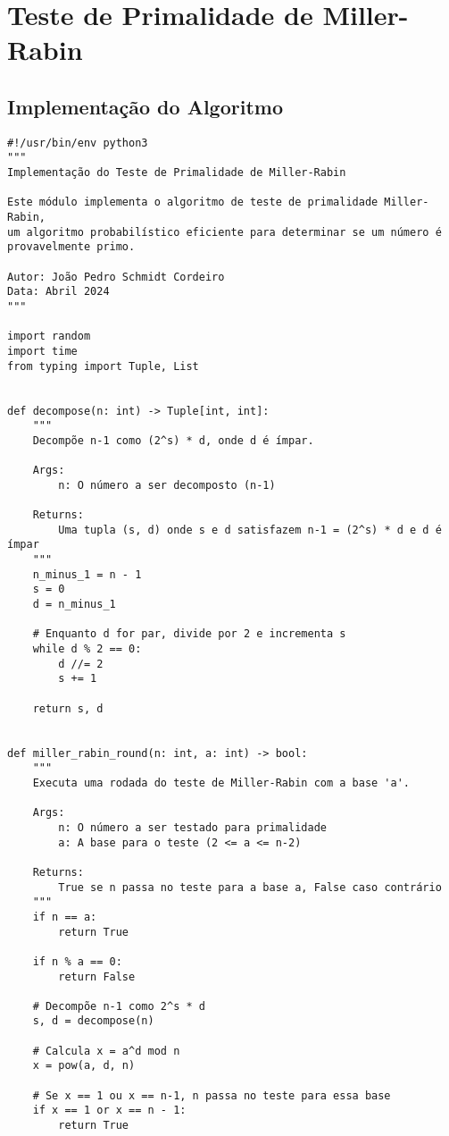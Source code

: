 \section{Teste de Primalidade de Miller-Rabin}\label{apx:miller-rabin-impl}

\subsection{Implementação do Algoritmo}

\begin{verbatim}
#!/usr/bin/env python3
"""
Implementação do Teste de Primalidade de Miller-Rabin

Este módulo implementa o algoritmo de teste de primalidade Miller-Rabin,
um algoritmo probabilístico eficiente para determinar se um número é provavelmente primo.

Autor: João Pedro Schmidt Cordeiro
Data: Abril 2024
"""

import random
import time
from typing import Tuple, List


def decompose(n: int) -> Tuple[int, int]:
    """
    Decompõe n-1 como (2^s) * d, onde d é ímpar.
    
    Args:
        n: O número a ser decomposto (n-1)
    
    Returns:
        Uma tupla (s, d) onde s e d satisfazem n-1 = (2^s) * d e d é ímpar
    """
    n_minus_1 = n - 1
    s = 0
    d = n_minus_1
    
    # Enquanto d for par, divide por 2 e incrementa s
    while d % 2 == 0:
        d //= 2
        s += 1
    
    return s, d


def miller_rabin_round(n: int, a: int) -> bool:
    """
    Executa uma rodada do teste de Miller-Rabin com a base 'a'.
    
    Args:
        n: O número a ser testado para primalidade
        a: A base para o teste (2 <= a <= n-2)
    
    Returns:
        True se n passa no teste para a base a, False caso contrário
    """
    if n == a:
        return True
    
    if n % a == 0:
        return False
    
    # Decompõe n-1 como 2^s * d
    s, d = decompose(n)
    
    # Calcula x = a^d mod n
    x = pow(a, d, n)
    
    # Se x == 1 ou x == n-1, n passa no teste para essa base
    if x == 1 or x == n - 1:
        return True
    

\end{verbatim}
